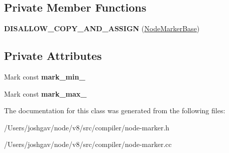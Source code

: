 \subsection*{Private Member Functions}
\begin{DoxyCompactItemize}
\item 
{\bfseries D\+I\+S\+A\+L\+L\+O\+W\+\_\+\+C\+O\+P\+Y\+\_\+\+A\+N\+D\+\_\+\+A\+S\+S\+I\+GN} (\hyperlink{classv8_1_1internal_1_1compiler_1_1_node_marker_base}{Node\+Marker\+Base})\hypertarget{classv8_1_1internal_1_1compiler_1_1_node_marker_base_aab4e8fa45e5ebe027b6e4cd12aa78f10}{}\label{classv8_1_1internal_1_1compiler_1_1_node_marker_base_aab4e8fa45e5ebe027b6e4cd12aa78f10}

\end{DoxyCompactItemize}
\subsection*{Private Attributes}
\begin{DoxyCompactItemize}
\item 
Mark const {\bfseries mark\+\_\+min\+\_\+}\hypertarget{classv8_1_1internal_1_1compiler_1_1_node_marker_base_a351b7d6c838facfd2aa7da086255f4e5}{}\label{classv8_1_1internal_1_1compiler_1_1_node_marker_base_a351b7d6c838facfd2aa7da086255f4e5}

\item 
Mark const {\bfseries mark\+\_\+max\+\_\+}\hypertarget{classv8_1_1internal_1_1compiler_1_1_node_marker_base_a074f6b644357f7d749ffb64c4ac54bef}{}\label{classv8_1_1internal_1_1compiler_1_1_node_marker_base_a074f6b644357f7d749ffb64c4ac54bef}

\end{DoxyCompactItemize}


The documentation for this class was generated from the following files\+:\begin{DoxyCompactItemize}
\item 
/\+Users/joshgav/node/v8/src/compiler/node-\/marker.\+h\item 
/\+Users/joshgav/node/v8/src/compiler/node-\/marker.\+cc\end{DoxyCompactItemize}
